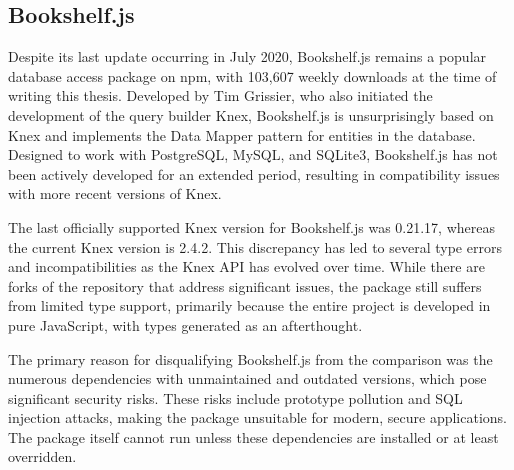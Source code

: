 \subsection{Bookshelf.js}

Despite its last update occurring in July 2020, Bookshelf.js remains a popular
database access package on npm, with 103,607 weekly downloads at the time of
writing this thesis. Developed by Tim Grissier, who also initiated the
development of the query builder Knex, Bookshelf.js is unsurprisingly based on
Knex and implements the Data Mapper pattern for entities in the database.
Designed to work with PostgreSQL, MySQL, and SQLite3, Bookshelf.js has not been
actively developed for an extended period, resulting in compatibility issues
with more recent versions of Knex.

The last officially supported Knex version for Bookshelf.js was 0.21.17, whereas
the current Knex version is 2.4.2. This discrepancy has led to several type
errors and incompatibilities as the Knex API has evolved over time. While there
are forks of the repository that address significant issues, the package still
suffers from limited type support, primarily because the entire project is
developed in pure JavaScript, with types generated as an afterthought.

The primary reason for disqualifying Bookshelf.js from the comparison was the
numerous dependencies with unmaintained and outdated versions, which pose
significant security risks. These risks include prototype pollution and SQL
injection attacks, making the package unsuitable for modern, secure
applications. The package itself cannot run unless these dependencies are
installed or at least overridden.
